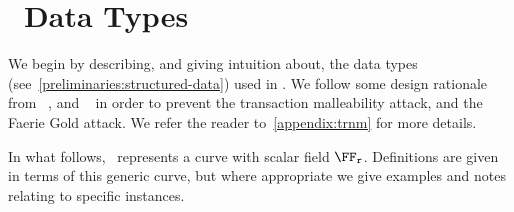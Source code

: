 
\section{\zeth~Data Types}\label{zeth-protocol:zeth-data-types}

We begin by describing, and giving intuition about, the data types (see~\cref{preliminaries:structured-data}) used in \zeth.
We follow some design rationale from \zerocash~\cite{sasson2014zerocash}, and \zcash~\cite{zcashprotocol} in order to prevent the transaction malleability attack, and the Faerie Gold attack\cite[Section 8.4]{zcashprotocol}. We refer the reader to~\cref{appendix:trnm} for more details.

In what follows, \Curve~represents a curve with scalar field $\FFx{\rCURVE}$. Definitions are given in terms of this generic curve, but where appropriate we give examples and notes relating to specific instances. %

